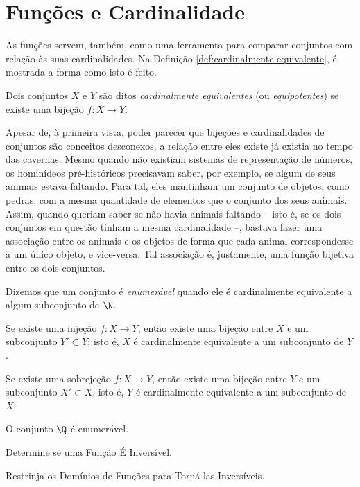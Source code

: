 \section{Funções e Cardinalidade}

As funções servem, também, como uma ferramenta para comparar conjuntos com relação às suas cardinalidades.
Na Definição \ref{def:cardinalmente-equivalente}, é mostrada a forma como isto é feito.

\begin{definition}
\label{def:cardinalmente-equivalente}
Dois conjuntos $X$ e $Y$ são ditos \emph{cardinalmente equivalentes}
(ou \emph{equipotentes}) se existe uma bijeção $f : X \to Y$.
\end{definition}

Apesar de, à primeira vista, poder parecer que bijeções e cardinalidades de conjuntos são conceitos desconexos, a relação entre eles existe já existia no tempo das cavernas.
Mesmo quando não existiam sistemas de representação de números, os hominídeos pré-históricos precisavam saber, por exemplo, se algum de seus animais estava faltando. 
Para tal, eles mantinham um conjunto de objetos, como pedras, com a mesma quantidade de elementos que o conjunto dos seus animais.
Assim, quando queriam saber se não havia animais faltando -- isto é, se os dois conjuntos em questão tinham a mesma cardinalidade --, bastava fazer uma associação entre os animais e os objetos de forma que cada animal correspondesse a um único objeto, e vice-versa.
Tal associação é, justamente, uma função bijetiva entre os dois conjuntos.

\begin{definition}
Dizemos que um conjunto é \emph{enumerável} quando ele é cardinalmente equivalente a algum subconjunto de $\N$.
\end{definition}

\begin{theorem}
Se existe uma injeção $f: X \to Y$, então existe uma bijeção entre $X$ e um subconjunto $Y' \subset Y$; isto é, $X$ é cardinalmente
equivalente a um subconjunto de $Y$.
\end{theorem}

\begin{theorem}
Se existe uma sobrejeção $f : X \to Y$, então existe uma bijeção entre $Y$ e um subconjunto $X' \subset X$, isto é, $Y$ é
cardinalmente equivalente a um subconjunto de $X$.
\end{theorem}

\begin{example}
    O conjunto $\Q$ é enumerável.
\end{example}

\begin{onlineact}
    {Determine se uma Função É Inversível}.
\end{onlineact}

\begin{onlineact}
    {Restrinja os Domínios de Funções para Torná-las Inversíveis}.
\end{onlineact}